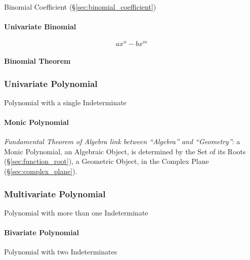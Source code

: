 Binomial Coefficient (\S\ref{sec:binomial_coefficient})



\paragraph{Univariate Binomial}\label{sec:univariate_binomial}\hfill

\[
  a x^n - b x^m
\]


\paragraph{Binomial Theorem}\label{sec:binomial_theorem}\hfill



\subsubsection{Univariate Polynomial}\label{sec:univariate_polynomial}

Polynomial with a single Indeterminate



\paragraph{Monic Polynomial}\label{sec:monic_polynomial}\hfill

\emph{Fundamental Theorem of Algebra link between ``Algebra'' and
  ``Geometry''}: a Monic Polynomial, an Algebraic Object, is determined by the
Set of its Roots (\S\ref{sec:function_root}), a Geometric Object, in the
Complex Plane (\S\ref{sec:complex_plane}).



\subsubsection{Multivariate Polynomial}\label{sec:multivariate_polynomial}

Polynomial with more than one Indeterminate



\paragraph{Bivariate Polynomial}\label{sec:bivariate_polynomial}\hfill

Polynomial with two Indeterminates



